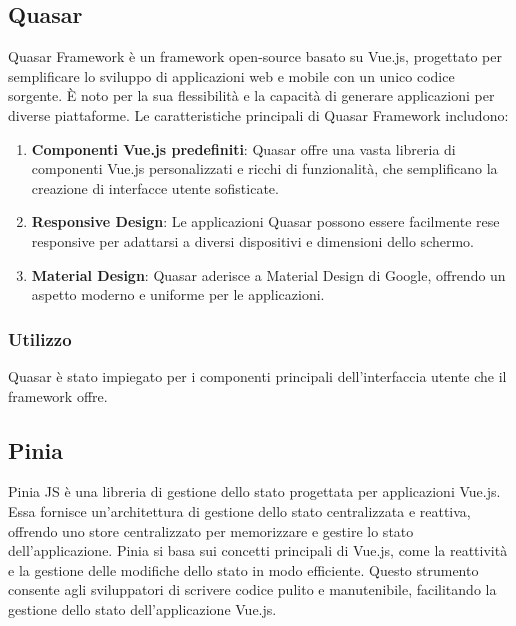 %
%
%
\subsection{Quasar}

Quasar Framework è un framework open-source basato su Vue.js, progettato per semplificare lo sviluppo di applicazioni web e mobile con un unico codice sorgente.
%
È noto per la sua flessibilità e la capacità di generare applicazioni per diverse piattaforme.
%
Le caratteristiche principali di Quasar Framework includono:

\begin{enumerate}
    \item \textbf{Componenti Vue.js predefiniti}: Quasar offre una vasta libreria di componenti Vue.js personalizzati e ricchi di funzionalità, che semplificano la creazione di interfacce utente sofisticate.

    \item \textbf{Responsive Design}: Le applicazioni Quasar possono essere facilmente rese responsive per adattarsi a diversi dispositivi e dimensioni dello schermo.

    \item \textbf{Material Design}: Quasar aderisce a Material Design di Google, offrendo un aspetto moderno e uniforme per le applicazioni.
\end{enumerate}

%
%
%
\subsubsection{Utilizzo}

Quasar è stato impiegato per i componenti principali dell'interfaccia utente che il framework offre.

%
%
%
\subsection{Pinia}

Pinia JS è una libreria di gestione dello stato progettata per applicazioni Vue.js.
%
Essa fornisce un'architettura di gestione dello stato centralizzata e reattiva, offrendo uno store centralizzato per memorizzare e gestire lo stato dell'applicazione.
%
Pinia si basa sui concetti principali di Vue.js, come la reattività e la gestione delle modifiche dello stato in modo efficiente.
%
Questo strumento consente agli sviluppatori di scrivere codice pulito e manutenibile, facilitando la gestione dello stato dell'applicazione Vue.js.

